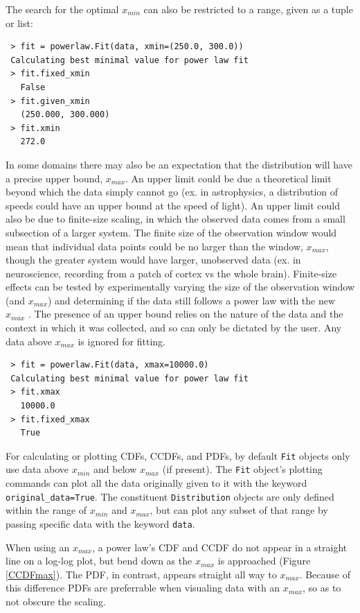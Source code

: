 \documentclass[10pt]{article}
\begin{document}
 The search for the optimal $x_{min}$ can also be restricted to a range, given as a tuple or list:
 \begin{verbatim}
 > fit = powerlaw.Fit(data, xmin=(250.0, 300.0))
 Calculating best minimal value for power law fit
 > fit.fixed_xmin
   False
 > fit.given_xmin
   (250.000, 300.000)
 > fit.xmin
   272.0
 \end{verbatim}
 
 In some domains there may also be an expectation that the distribution will have a precise upper bound, $x_{max}$. An upper limit could be due a theoretical limit beyond which the data simply cannot go (ex. in astrophysics, a distribution of speeds could have an upper bound at the speed of light). An upper limit could also be due to finite-size scaling, in which the observed data comes from a small subsection of a larger system. The finite size of the observation window would mean that individual data points could be no larger than the window, $x_{max}$, though the greater system would have larger, unobserved data (ex. in neuroscience, recording from a patch of cortex vs the whole brain). Finite-size effects can be tested by experimentally varying the size of the observation window (and $x_{max}$) and determining if the data still follows a power law with the new $x_{max}$ \cite{Beggs2003, Shriki2013}. The presence of an upper bound relies on the nature of the data and the context in which it was collected, and so can only be dictated by the user. Any data above $x_{max}$ is ignored for fitting. 
 
 \begin{verbatim}
 > fit = powerlaw.Fit(data, xmax=10000.0)
 Calculating best minimal value for power law fit
 > fit.xmax
   10000.0
 > fit.fixed_xmax
   True
 \end{verbatim}
 
 For calculating or plotting CDFs, CCDFs, and PDFs, by default \verb"Fit" objects only use data above $x_{min}$ and below $x_{max}$ (if present). The \verb$Fit$ object's plotting commands can plot all the data originally given to it with the keyword \verb$original_data=True$. The constituent \verb$Distribution$ objects are only defined within the range of $x_{min}$ and $x_{max}$, but can plot any subset of that range by passing specific data with the keyword \verb$data$. 
 
 When using an $x_{max}$, a power law's CDF and CCDF do not appear in a straight line on a log-log plot, but bend down as the $x_{max}$ is approached (Figure \ref{CCDFmax}). The PDF, in contrast, appears straight all way to $x_{max}$. Because of this difference PDFs are preferrable when visualing data with an $x_{max}$, so as to not obscure the scaling.
 
\end{document}
